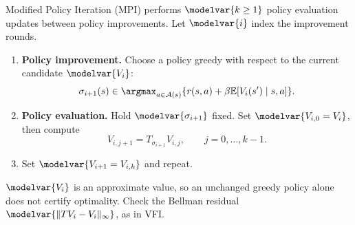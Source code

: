 \begin{frame}{Modified Policy Iteration (MPI)}
\small
{} performs \(\modelvar{k\geq1}\) policy evaluation updates between policy improvements. Let \(\modelvar{i}\) index the improvement rounds.
\begin{enumerate}
\item \textbf{Policy improvement.} Choose a policy greedy with respect to the current candidate \(\modelvar{V_i}\):
\[\sigma_{i+1}(s)\in\argmax_{a\in\Aset(s)}\{r(s,a)+\beta\E[V_i(s')\mid s,a]\}.\]
\item \textbf{Policy evaluation.} Hold \(\modelvar{\sigma_{i+1}}\) fixed. Set \(\modelvar{V_{i,0}=V_i}\), then compute
\[V_{i,j+1}=T_{\sigma_{i+1}}V_{i,j},\qquad j=0,\ldots,k-1.\]
\item Set \(\modelvar{V_{i+1}=V_{i,k}}\) and repeat.
\end{enumerate}
\par\smallskip
\(\modelvar{V_i}\) is an approximate value, so an unchanged greedy policy alone does not certify optimality. Check the Bellman residual \(\modelvar{\|TV_i-V_i\|_\infty}\), as in VFI.
\end{frame}

